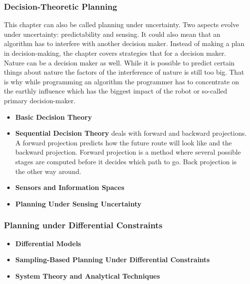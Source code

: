 \cite{planning_algorithms_steven_m_lavalle}

\subsubsection{Decision-Theoretic Planning}

This chapter can also be called planning under uncertainty. Two aspects evolve under uncertainty: predictability and sensing. It could also mean that an algorithm has to interfere with another decision maker. Instead of making a plan in decision-making, the chapter covers strategies that for a decision maker. Nature can be a decision maker as well. While it is possible to predict certain things about nature the factors of the interference of nature is still too big. That is why while programming an algorithm the programmer has to concentrate on the earthly influence which has the biggest impact of the robot or so-called primary decision-maker.

\begin{itemize}
    \item \textbf{Basic Decision Theory}
    \item \textbf{Sequential Decision Theory} deals with forward and backward projections. A forward projection predicts how the future route will look like and the backward projection. Forward projection is a method where several possible stages are computed before it decides which path to go. Back projection is the other way around. 
    \item \textbf{Sensors and Information Spaces}
    \item \textbf{Planning Under Sensing Uncertainty}
\end{itemize}

\cite{planning_algorithms_steven_m_lavalle}

\subsubsection{Planning under Differential Constraints}

\begin{itemize}
    \item \textbf{Differential Models}
    \item \textbf{Sampling-Based Planning Under Differential Constraints}
    \item \textbf{System Theory and Analytical Techniques}
\end{itemize}

